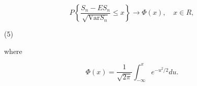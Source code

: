 $$P \left\{ \frac{S_n - E S_n}{\sqrt{\text{Var} S_n}} \leq x \right\} \rightarrow \Phi(x), \quad x \in R,$$

(5)

where

$$\Phi(x) = \frac{1}{\sqrt{2\pi}} \int_{-\infty}^{x} e^{-u^2/2} du.$$
